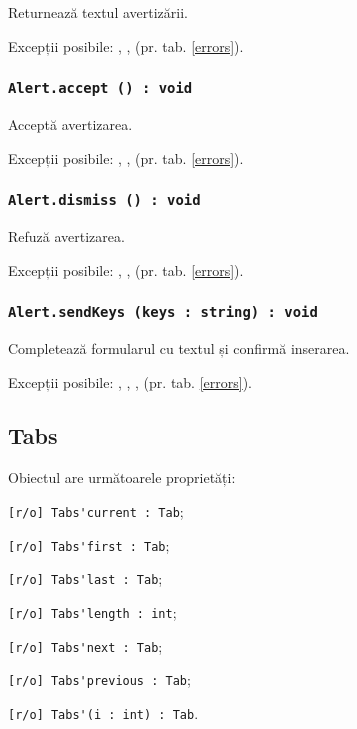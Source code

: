 Returnează textul avertizării.

Excepții posibile: , ,  (pr. tab. \ref{errors}).

\subsubsection{\lstinline|Alert.accept () : void|}

Acceptă avertizarea.

Excepții posibile: , ,  (pr. tab. \ref{errors}).

\subsubsection{\lstinline|Alert.dismiss () : void|}

Refuză avertizarea.

Excepții posibile: , ,  (pr. tab. \ref{errors}).

\subsubsection{\lstinline|Alert.sendKeys (keys : string) : void|}

Completează formularul cu textul  și confirmă inserarea.

Excepții posibile: , , ,  (pr. tab. \ref{errors}).

\subsection{{\color{orange} Tabs}}

Obiectul \tabs{} are următoarele proprietăți:
\begin{icItems}
	\item \lstinline|[r/o] Tabs'current : Tab|;
	\item \lstinline|[r/o] Tabs'first : Tab|;
	\item \lstinline|[r/o] Tabs'last : Tab|;
	\item \lstinline|[r/o] Tabs'length : int|;
	\item \lstinline|[r/o] Tabs'next : Tab|;
	\item \lstinline|[r/o] Tabs'previous : Tab|;
	\item \lstinline|[r/o] Tabs'(i : int) : Tab|.
\end{icItems}

